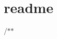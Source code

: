 \chapter{readme}
\hypertarget{md_readme}{}\label{md_readme}
/\texorpdfstring{$\ast$}{*}\texorpdfstring{$\ast$}{*} ~\newline

\begin{DoxyItemize}
\item 
\end{DoxyItemize}